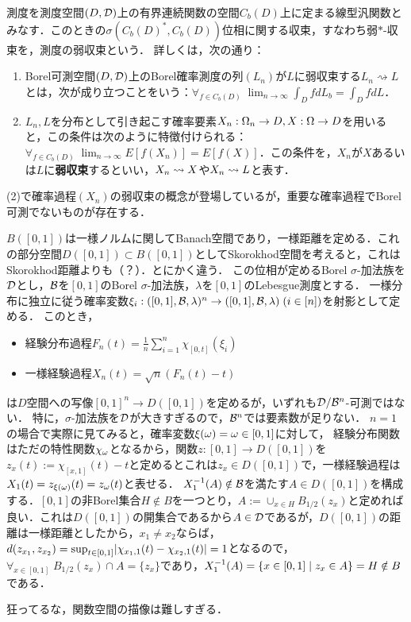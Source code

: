 \documentclass[uplatex,dvipdfmx]{jsreport}
\begin{document}
\begin{definition}
    測度を測度空間$(D,\mathcal{D})$上の有界連続関数の空間$C_b(D)$上に定まる線型汎関数とみなす．このときの$\sigma(C_b(D)^*,C_b(D))$位相に関する収束，すなわち弱$*$-収束を，測度の弱収束という．
    詳しくは，次の通り：
    \begin{enumerate}
        \item Borel可測空間$(D,\mathcal{D})$上のBorel確率測度の列$(L_n)$が$L$に弱収束する$L_n\rightsquigarrow L$とは，次が成り立つことをいう：$\forall_{f\in C_b(D)}\;\lim_{n\to\infty}\int_DfdL_b=\int_DfdL$．
        \item $L_n,L$を分布として引き起こす確率要素$X_n:\Omega_n\to D,X:\Omega\to D$を用いると，この条件は次のように特徴付けられる：$\forall_{f\in C_b(D)}\;\lim_{n\to\infty}E[f(X_n)]=E[f(X)]$．この条件を，$X_n$が$X$あるいは$L$に\textbf{弱収束}するといい，$X_n\rightsquigarrow X$や$X_n\rightsquigarrow L$と表す．
    \end{enumerate}
\end{definition}
\begin{remark}
    (2)で確率過程$(X_n)$の弱収束の概念が登場しているが，重要な確率過程でBorel可測でないものが存在する．
\end{remark}

\begin{example}\label{exp-non-measurable-process}
    $B([0,1])$は一様ノルムに関してBanach空間であり，一様距離を定める．これの部分空間$D([0,1])\subset B([0,1])$としてSkorokhod空間を考えると，これはSkorokhod距離よりも（？）．とにかく違う．
    この位相が定めるBorel $\sigma$-加法族を$\mathcal{D}$とし，$\mathcal{B}$を$[0,1]$のBorel $\sigma$-加法族，$\lambda$を$[0,1]$のLebesgue測度とする．
    一様分布に独立に従う確率変数$\xi_i:([0,1],\mathcal{B},\lambda)^n\to([0,1],\mathcal{B},\lambda)\;(i\in[n])$を射影として定める．
    このとき，
    \begin{itemize}
        \item 経験分布過程$F_n(t)=\frac{1}{n}\sum_{i=1}^n\chi_{[0,t]}(\xi_i)$
        \item 一様経験過程$X_n(t)=\sqrt{n}(F_n(t)-t)$
    \end{itemize}
    は$D$空間への写像$[0,1]^n\to D([0,1])$を定めるが，いずれも$\mathcal{D}/\mathcal{B}^n$-可測ではない．
    特に，$\sigma$-加法族を$\mathcal{D}$が大きすぎるので，$\mathcal{B}^n$では要素数が足りない．
    $n=1$の場合で実際に見てみると，確率変数$\xi(\omega)=\omega\in[0,1]$に対して，
    経験分布関数はただの特性関数$\chi_{\omega}$となるから，関数$z:[0,1]\to D([0,1])$を$z_x(t):=\chi_{[x,1]}(t)-t$と定めるとこれは$z_x\in D([0,1])$で，一様経験過程は$X_1(t)=z_{\xi(\omega)}(t)=z_\omega(t)$と表せる．
    $X_1^{-1}(A)\notin\mathcal{B}$を満たす$A\in D([0,1])$を構成する．$[0,1]$の非Borel集合$H\notin B$を一つとり，$A:=\cup_{x\in H}B_{1/2}(z_x)$と定めれば良い．これは$D([0,1])$の開集合であるから$A\in\mathcal{D}$であるが，$D([0,1])$の距離は一様距離としたから，$x_1\ne x_2$ならば，$d(z_{x_1},z_{x_2})=\sup_{t\in[0,1]}\lvert\chi_{x_1,1}(t)-\chi_{x_2,1}(t)\rvert=1$となるので，$\forall_{x\in[0,1]}\;B_{1/2}(z_x)\cap A=\{z_x\}$であり，$X_1^{-1}(A)=\left\{x\in[0,1]\mid z_x\in A\right\}=H\notin B$である．

    狂ってるな，関数空間の描像は難しすぎる．
\end{example}
\end{document}

